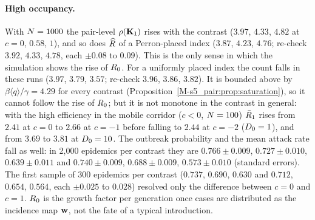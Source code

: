 \paragraph{High occupancy.} With $N=1000$ the pair-level $\rho(\mathbf{K}_1)$ rises with the contrast
($3.97$, $4.33$, $4.82$ at $c=0$, $0.58$, $1$), and so does $\widehat{R}$ of a Perron-placed index ($3.87$, $4.23$,
$4.76$; re-check $3.92$, $4.33$, $4.78$, each $\pm0.08$ to $0.09$).
This is the only sense in which the simulation shows the rise of $R_0$. For a uniformly placed index the
count falls in these runs ($3.97$, $3.79$, $3.57$; re-check $3.96$, $3.86$, $3.82$). It is bounded above by
$\beta\langle q\rangle/\gamma=4.29$ for every contrast (Proposition~\ref{M-s5_pair:prop:saturation}), so it
cannot follow the rise of $R_0$; but it is not monotone in the contrast in general: with the high efficiency
in the mobile corridor ($c<0$, $N=100$) $\bar{R}_1$ rises from $2.41$ at $c=0$ to $2.66$ at $c=-1$ before
falling to $2.44$ at $c=-2$ ($D_0=1$), and from $3.69$ to $3.81$ at $D_0=10$.
The outbreak probability and the mean attack rate fall as well: in 2{,}000 epidemics per contrast they are
$0.766\pm0.009$, $0.727\pm0.010$, $0.639\pm0.011$ and $0.740\pm0.009$, $0.688\pm0.009$, $0.573\pm0.010$
(standard errors). The first sample of 300 epidemics per contrast ($0.737$, $0.690$, $0.630$ and $0.712$,
$0.654$, $0.564$, each $\pm0.025$ to $0.028$) resolved only the difference between $c=0$ and $c=1$. $R_0$ is
the growth factor per generation once cases are distributed as the incidence map $\mathbf{w}$, not the fate of a
typical introduction.

